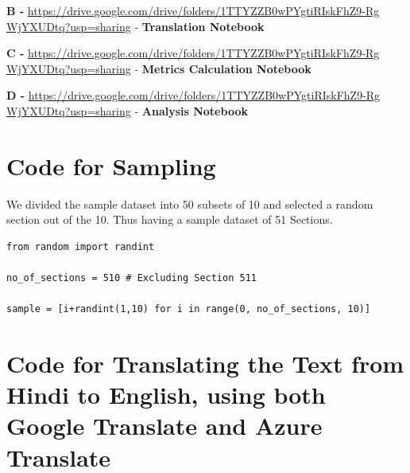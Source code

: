 {\large\textbf{B -}} \href{https://drive.google.com/drive/folders/1TTYZZB0wPYgtiRIskFhZ9-RgWjYXUDtq?usp=sharing}{https://drive.google.com/drive/folders/1TTYZZB0wPYgtiRIskFhZ9-Rg\\WjYXUDtq?usp=sharing} - \textbf{Translation Notebook}

{\large\textbf{C -}} \href{https://drive.google.com/drive/folders/1TTYZZB0wPYgtiRIskFhZ9-RgWjYXUDtq?usp=sharing}{https://drive.google.com/drive/folders/1TTYZZB0wPYgtiRIskFhZ9-Rg\\WjYXUDtq?usp=sharing} - \textbf{Metrics Calculation Notebook}

{\large\textbf{D -}} \href{https://drive.google.com/drive/folders/1TTYZZB0wPYgtiRIskFhZ9-RgWjYXUDtq?usp=sharing}{https://drive.google.com/drive/folders/1TTYZZB0wPYgtiRIskFhZ9-Rg\\WjYXUDtq?usp=sharing} - \textbf{Analysis Notebook}

\section*{Code for Sampling}

We divided the sample dataset into 50 subsets of 10 and selected a random section out of the 10. Thus having a sample dataset of 51 Sections.

\singlespacing
\begin{verbatim}
from random import randint

no_of_sections = 510 # Excluding Section 511

sample = [i+randint(1,10) for i in range(0, no_of_sections, 10)]
\end{verbatim}
\doublespacing

\section*{Code for Translating the Text from Hindi to English, using both Google Translate and Azure Translate}

